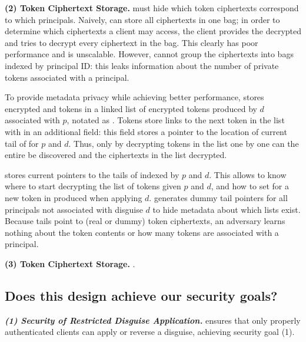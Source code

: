 
\vspace{6pt}\noindent\textbf{(2) \tdata{} Token Ciphertext Storage.}
\sys must hide which token ciphertexts correspond to which principals.  Naively, \sys can store
all ciphertexts in one bag; in order to determine which ciphertexts a client may access, the client
provides the decrypted  and \sys tries to decrypt every ciphertext in the bag. This clearly
has poor performance and is unscalable.
However, \sys cannot group the ciphertexts into bags indexed by principal ID: this leaks information
about the number of private tokens associated with a principal.

To provide metadata privacy while achieving better performance, \sys stores encrypted  and
 tokens in a linked list of encrypted tokens produced by $d$ associated with $p$, notated
as . 
Tokens store links to the next token in the list with in an additional  field: this
field stores a pointer to the location of current tail of  for $p$ and $d$.
Thus, only by decrypting tokens in the list one by one can the entire  be discovered and
the ciphertexts in the list decrypted.

\sys stores current pointers to the tails of  indexed by $p$ and $d$. This allows \sys to
know where to start decrypting the list of tokens given $p$ and $d$, and how to set
 for a new token in  produced when applying $d$. \sys generates dummy
tail pointers for all principals not associated with disguise $d$ to hide metadata about which lists
exist.
Because  tails point to (real or dummy) token ciphertexts, an adversary learns nothing
about the token contents or how many tokens are associated with a principal.

\vspace{6pt}\noindent\textbf{(3) \tpriv{} Token Ciphertext Storage.}
.

\subsection{Does this design achieve our security goals?}
\label{sec:achievegoals}
\vspace{6pt}\noindent\textbf{\emph{(1) Security of Restricted Disguise Application.}}
\sys ensures that only properly authenticated clients can apply or
reverse a disguise, achieving security goal (1).

